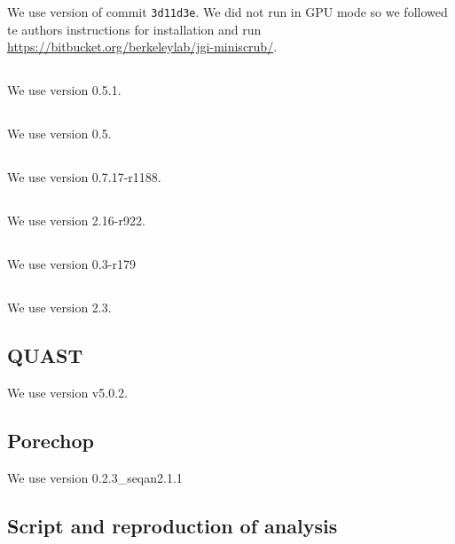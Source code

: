 \documentclass[./main.tex]{subfiles}
\begin{document}
We use version of commit \texttt{3d11d3e}. We did not run \miniscrub in GPU mode so we followed te  authors instructions for installation and run \url{https://bitbucket.org/berkeleylab/jgi-miniscrub/}.

\subsection{\yacrd}

We use version 0.5.1.

\subsection{\fpa}

We use version 0.5.

\subsection{\bwa}

We use version 0.7.17-r1188.

\subsection{\minimap}

We use version 2.16-r922.

\subsection{\miniasm}

We use version 0.3-r179

\subsection{\wtdbg}

We use version 2.3.

\subsection{QUAST}

We use version v5.0.2.

\subsection{Porechop}

We use version 0.2.3\_seqan2.1.1

\subsection{Script and reproduction of analysis}\label{sub:repro-everything}
\end{document}
